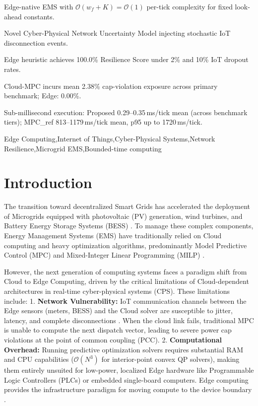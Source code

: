 \documentclass[preprint,12pt]{elsarticle}
\begin{document}
\begin{frontmatter}
\begin{highlights}
\item Edge-native EMS with $\mathcal{O}(w_f{+}K)=\mathcal{O}(1)$ per-tick complexity for fixed look-ahead constants.
\item Novel Cyber-Physical Network Uncertainty Model injecting stochastic IoT disconnection events.
\item Edge heuristic achieves 100.0\% Resilience Score under 2\% and 10\% IoT dropout rates.
\item Cloud-MPC incurs mean 2.38\% cap-violation exposure across primary benchmark; Edge: 0.00\%.
\item Sub-millisecond execution: Proposed 0.29--0.35\,ms/tick mean (across benchmark tiers); MPC\_ref 813--1179\,ms/tick mean, p95 up to 1720\,ms/tick.
\end{highlights}

\begin{keyword}
Edge Computing\sep Internet of Things\sep Cyber-Physical Systems\sep Network Resilience\sep Microgrid EMS\sep Bounded-time computing
\end{keyword}

\end{frontmatter}

\section{Introduction}
The transition toward decentralized Smart Grids has accelerated the deployment of Microgrids equipped with photovoltaic (PV) generation, wind turbines, and Battery Energy Storage Systems (BESS) \cite{lasseter2002microgrids,parhizi2015state}. To manage these complex components, Energy Management Systems (EMS) have traditionally relied on Cloud computing and heavy optimization algorithms, predominantly Model Predictive Control (MPC) and Mixed-Integer Linear Programming (MILP) \cite{hu2021,rawlings2009model}.

However, the next generation of computing systems faces a paradigm shift from Cloud to Edge Computing, driven by the critical limitations of Cloud-dependent architectures in real-time cyber-physical systems (CPS). These limitations include:
1. \textbf{Network Vulnerability:} IoT communication channels between the Edge sensors (meters, BESS) and the Cloud solver are susceptible to jitter, latency, and complete disconnections \cite{ding2019cyber,setiawan2021iot}. When the cloud link fails, traditional MPC is unable to compute the next dispatch vector, leading to severe power cap violations at the point of common coupling (PCC).
2. \textbf{Computational Overhead:} Running predictive optimization solvers requires substantial RAM and CPU capabilities ($\mathcal{O}(N^3)$ for interior-point convex QP solvers), making them entirely unsuited for low-power, localized Edge hardware like Programmable Logic Controllers (PLCs) or embedded single-board computers. Edge computing provides the infrastructure paradigm for moving compute to the device boundary \cite{shi2011survey,mao2017survey}.
\end{document}

